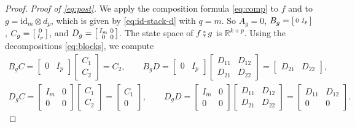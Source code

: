 \documentclass[11pt,a4paper]{article}
\theoremstyle{plain}
\theoremstyle{definition}
\theoremstyle{remark}
\newcommand{\R}{\mathbb{R}}
\newcommand{\id}{\mathrm{id}}
\newcommand{\then}{\mathbin{\fatsemi}}
\begin{document}
\begin{proof}
    \emph{Proof of \cref{eq:post}.}
    We apply the composition formula \cref{eq:comp} to $f$ and to $g = \id_m \otimes d_p$, which is given by \cref{eq:id-stack-d} with $q = m$.
    So $A_g = 0$, $B_g = \begin{bsmallmatrix} 0 & I_p \end{bsmallmatrix}$, $C_g = \begin{bsmallmatrix} 0 \\ I_p \end{bsmallmatrix}$, and $D_g = \begin{bsmallmatrix} I_m & 0 \\ 0 & 0 \end{bsmallmatrix}$.
    The state space of $f \then g$ is $\R^{k+p}$.
    Using the decompositions \cref{eq:blocks}, we compute
    \begin{gather*}
        B_g C = \begin{bmatrix} 0 & I_p \end{bmatrix} \begin{bmatrix} C_1 \\ C_2 \end{bmatrix} = C_2,
        \qquad
        B_g D = \begin{bmatrix} 0 & I_p \end{bmatrix} \begin{bmatrix} D_{11} & D_{12} \\ D_{21} & D_{22} \end{bmatrix} = \begin{bmatrix} D_{21} & D_{22} \end{bmatrix}, \\
        D_g C = \begin{bmatrix} I_m & 0 \\ 0 & 0 \end{bmatrix} \begin{bmatrix} C_1 \\ C_2 \end{bmatrix} = \begin{bmatrix} C_1 \\ 0 \end{bmatrix},
        \qquad
        D_g D = \begin{bmatrix} I_m & 0 \\ 0 & 0 \end{bmatrix} \begin{bmatrix} D_{11} & D_{12} \\ D_{21} & D_{22} \end{bmatrix} = \begin{bmatrix} D_{11} & D_{12} \\ 0 & 0 \end{bmatrix} .

\end{gather*}
\end{proof}
\end{document}
